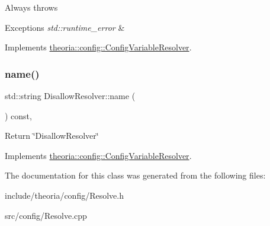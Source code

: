 Always throws 
\begin{DoxyExceptions}{Exceptions}
{\em std\+::runtime\+\_\+error} & \\
\hline
\end{DoxyExceptions}


Implements \hyperlink{classtheoria_1_1config_1_1ConfigVariableResolver}{theoria\+::config\+::\+Config\+Variable\+Resolver}.

\mbox{\label{classtheoria_1_1config_1_1DisallowResolver_a8352df79f9e0f17fbfad8801bfdcc99e}} 
\subsubsection{\texorpdfstring{name()}{name()}}
{\footnotesize\ttfamily std\+::string Disallow\+Resolver\+::name (\begin{DoxyParamCaption}{ }\end{DoxyParamCaption}) const\hspace{0.3cm}{\ttfamily [override]}, {\ttfamily [virtual]}}

Return \char`\"{}\+Disallow\+Resolver\char`\"{} 

Implements \hyperlink{classtheoria_1_1config_1_1ConfigVariableResolver_a026bda729faf988eaef334a45ec92303}{theoria\+::config\+::\+Config\+Variable\+Resolver}.



The documentation for this class was generated from the following files\+:\begin{DoxyCompactItemize}
\item 
include/theoria/config/Resolve.\+h\item 
src/config/Resolve.\+cpp\end{DoxyCompactItemize}
